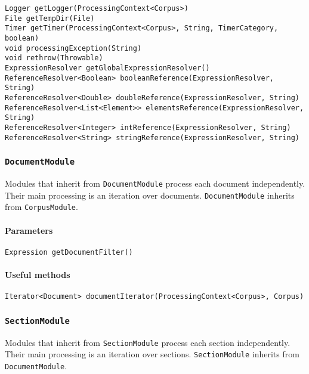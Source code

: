 \documentclass[a4paper]{article}
\begin{document}
\texttt{Logger getLogger(ProcessingContext<Corpus>)}\\
\texttt{File getTempDir(File)}\\
\texttt{Timer getTimer(ProcessingContext<Corpus>, String, TimerCategory, boolean)}\\

\texttt{void processingException(String)}\\
\texttt{void rethrow(Throwable)}\\

\texttt{ExpressionResolver getGlobalExpressionResolver()}\\
\texttt{ReferenceResolver<Boolean> booleanReference(ExpressionResolver, String)}\\
\texttt{ReferenceResolver<Double> doubleReference(ExpressionResolver, String)}\\
\texttt{ReferenceResolver<List<Element>> elementsReference(ExpressionResolver, String)}\\
\texttt{ReferenceResolver<Integer> intReference(ExpressionResolver, String)}\\
\texttt{ReferenceResolver<String> stringReference(ExpressionResolver, String)}\\

\subsubsection{\texttt{DocumentModule}}
Modules that inherit from \texttt{DocumentModule} process each document independently.
Their main processing is an iteration over documents.
\texttt{DocumentModule} inherits from \texttt{CorpusModule}.

\paragraph{Parameters}
\texttt{Expression getDocumentFilter()}

\paragraph{Useful methods}
\texttt{Iterator<Document> documentIterator(ProcessingContext<Corpus>, Corpus)}

\subsubsection{\texttt{SectionModule}}
Modules that inherit from \texttt{SectionModule} process each section independently.
Their main processing is an iteration over sections.
\texttt{SectionModule} inherits from \texttt{DocumentModule}.
\end{document}
